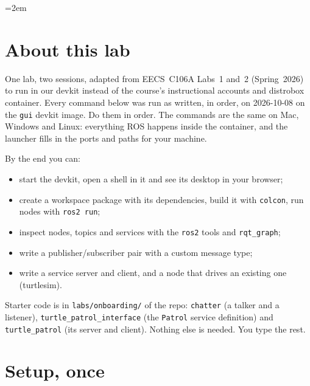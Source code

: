 \documentclass[11pt,a4paper]{article}
\begin{document}
\emergencystretch=2em

\section*{About this lab}

One lab, two sessions, adapted from EECS~C106A Labs~1 and~2 (Spring~2026) to run in our devkit
instead of the course's instructional accounts and distrobox container. Every command below was
run as written, in order, on 2026-10-08 on the \texttt{gui} devkit image. Do them in order. The
commands are the same on Mac, Windows and Linux: everything ROS happens inside the container,
and the launcher fills in the ports and paths for your machine.

By the end you can:
\begin{itemize}
  \item start the devkit, open a shell in it and see its desktop in your browser;
  \item create a workspace package with its dependencies, build it with \texttt{colcon}, run nodes with \texttt{ros2 run};
  \item inspect nodes, topics and services with the \texttt{ros2} tools and \texttt{rqt\_graph};
  \item write a publisher/subscriber pair with a custom message type;
  \item write a service server and client, and a node that drives an existing one (turtlesim).
\end{itemize}

Starter code is in \texttt{labs/onboarding/} of the repo: \texttt{chatter} (a talker and a
listener), \texttt{turtle\_patrol\_interface} (the \texttt{Patrol} service definition) and
\texttt{turtle\_patrol} (its server and client). Nothing else is needed. You type the rest.

\section{Setup, once}
\end{document}
